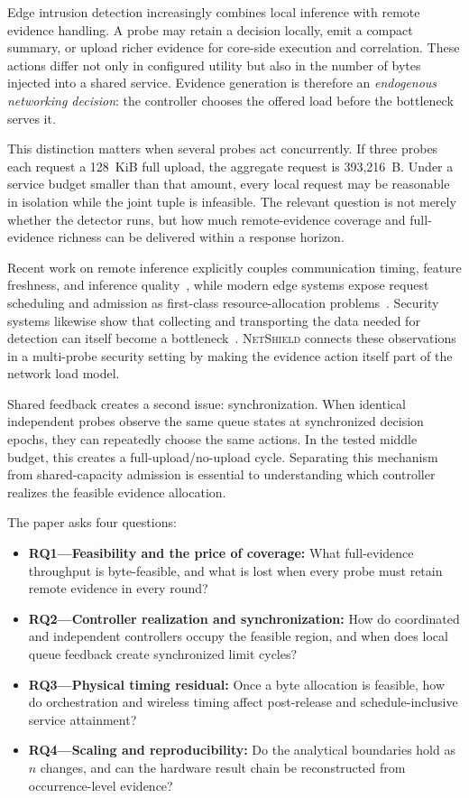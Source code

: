 \documentclass[10pt,journal]{IEEEtran}
\newcommand{\NetShield}{\textsc{NetShield}}
\begin{document}
Edge intrusion detection increasingly combines local inference with remote
evidence handling. A probe may retain a decision locally, emit a compact
summary, or upload richer evidence for core-side execution and correlation.
These actions differ not only in configured utility but also in the number of
bytes injected into a shared service. Evidence generation is therefore an
\emph{endogenous networking decision}: the controller chooses the offered
load before the bottleneck serves it.

This distinction matters when several probes act concurrently. If three
probes each request a 128~KiB full upload, the aggregate request is
393,216~B. Under a service budget smaller than that amount, every local
request may be reasonable in isolation while the joint tuple is infeasible.
The relevant question is not merely whether the detector runs, but how much
remote-evidence coverage and full-evidence richness can be delivered within
a response horizon.

Recent work on remote inference explicitly couples communication timing,
feature freshness, and inference quality~\cite{shisher2024timely,
ari2026goal}, while modern edge systems expose request scheduling and
admission as first-class resource-allocation problems~\cite{zhao2024cur,
hao2024edgetimer,li2025oacr2}. Security systems likewise show that collecting
and transporting the data needed for detection can itself become a
bottleneck~\cite{mirnajafizadeh2024isdc,oqaily2024chainpatrol}. \NetShield{}
connects these observations in a multi-probe security setting by making the
evidence action itself part of the network load model.

Shared feedback creates a second issue: synchronization. When identical
independent probes observe the same queue states at synchronized decision
epochs, they can repeatedly choose the same actions. In the tested middle
budget, this creates a full-upload/no-upload cycle. Separating this mechanism
from shared-capacity admission is essential to understanding which controller
realizes the feasible evidence allocation.

The paper asks four questions:
\begin{itemize}[leftmargin=1.25em]
\item \textbf{RQ1---Feasibility and the price of coverage:}
What full-evidence throughput is byte-feasible, and what is lost when every
probe must retain remote evidence in every round?
\item \textbf{RQ2---Controller realization and synchronization:}
How do coordinated and independent controllers occupy the feasible region,
and when does local queue feedback create synchronized limit cycles?
\item \textbf{RQ3---Physical timing residual:}
Once a byte allocation is feasible, how do orchestration and wireless timing
affect post-release and schedule-inclusive service attainment?
\item \textbf{RQ4---Scaling and reproducibility:}
Do the analytical boundaries hold as $n$ changes, and can the hardware result
chain be reconstructed from occurrence-level evidence?
\end{itemize}
\end{document}
